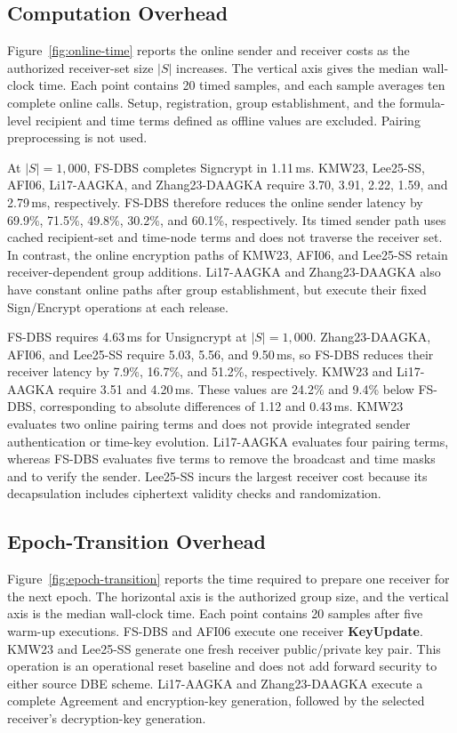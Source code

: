 \documentclass[sigconf,anonymous]{acmart}
\theoremstyle{definition}
\theoremstyle{definition}
\theoremstyle{definition}
\theoremstyle{definition}
\theoremstyle{definition}
\theoremstyle{definition}
\theoremstyle{definition}
\theoremstyle{definition}
\theoremstyle{definition}
\begin{document}
\subsection{Computation Overhead}
Figure~\ref{fig:online-time} reports the online sender and receiver costs as
the authorized receiver-set size $|S|$ increases.
The vertical axis gives the median wall-clock time. Each point contains 20
timed samples, and each sample averages ten complete online calls. Setup,
registration, group establishment, and the formula-level recipient and time
terms defined as offline values are excluded. Pairing preprocessing is not
used.



At $|S|=1{,}000$, FS-DBS completes Signcrypt in 1.11\,ms. KMW23, Lee25-SS,
AFI06, Li17-AAGKA, and Zhang23-DAAGKA require 3.70, 3.91, 2.22, 1.59, and
2.79\,ms, respectively. FS-DBS therefore reduces the online sender latency by
69.9\%, 71.5\%, 49.8\%, 30.2\%, and 60.1\%, respectively. Its timed sender
path uses cached recipient-set and time-node terms and does not traverse the
receiver set. In contrast, the online encryption paths of KMW23, AFI06, and
Lee25-SS retain receiver-dependent group additions. Li17-AAGKA and
Zhang23-DAAGKA also have constant online paths after group establishment, but
execute their fixed Sign/Encrypt operations at each release.

FS-DBS requires 4.63\,ms for Unsigncrypt at $|S|=1{,}000$. Zhang23-DAAGKA,
AFI06, and Lee25-SS require 5.03, 5.56, and 9.50\,ms, so FS-DBS reduces their
receiver latency by 7.9\%, 16.7\%, and 51.2\%, respectively. KMW23 and
Li17-AAGKA require 3.51 and 4.20\,ms. These values are 24.2\% and 9.4\% below
FS-DBS, corresponding to absolute differences of 1.12 and 0.43\,ms. KMW23
evaluates two online pairing terms and does not provide integrated sender
authentication or time-key evolution. Li17-AAGKA evaluates four pairing terms,
whereas FS-DBS evaluates five terms to remove the broadcast and time masks and
to verify the sender. Lee25-SS incurs the largest receiver cost because its
decapsulation includes ciphertext validity checks and randomization.

\subsection{Epoch-Transition Overhead}
Figure~\ref{fig:epoch-transition} reports the time required to prepare one
receiver for the next epoch. The horizontal axis is the authorized group size,
and the vertical axis is the median wall-clock time. Each point contains 20
samples after five warm-up executions. FS-DBS and AFI06 execute one receiver
\textbf{KeyUpdate}. KMW23 and Lee25-SS generate one fresh receiver public/private
key pair. This operation is an operational reset baseline and does not add
forward security to either source DBE scheme. Li17-AAGKA and Zhang23-DAAGKA
execute a complete Agreement and encryption-key generation, followed by the
selected receiver's decryption-key generation.
\end{document}
